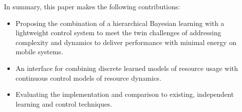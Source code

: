 In summary, this paper makes the following contributions:
\begin{itemize}
\item Proposing the combination of a hierarchical Bayesian learning
  with a lightweight control system to meet the twin challenges of
  addressing complexity and dynamics to deliver performance with
  minimal energy on mobile systems.
\item An interface for combining discrete learned models of resource
  usage with continuous control models of resource dynamics.
\item Evaluating the implementation and comparison to existing,
  independent learning and control techniques.
\end{itemize}


